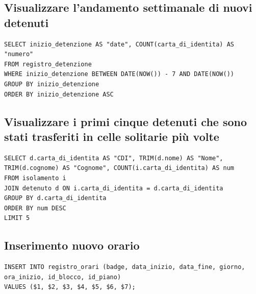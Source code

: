 \documentclass[a4paper,12pt]{report}
\begin{document}
\subsection{Visualizzare l'andamento settimanale di nuovi detenuti}
\begin{verbatim}
SELECT inizio_detenzione AS "date", COUNT(carta_di_identita) AS "numero"
FROM registro_detenzione
WHERE inizio_detenzione BETWEEN DATE(NOW()) - 7 AND DATE(NOW())
GROUP BY inizio_detenzione
ORDER BY inizio_detenzione ASC
\end{verbatim}
\subsection{Visualizzare i primi cinque detenuti che sono stati trasferiti in celle solitarie più volte}
\begin{verbatim}
SELECT d.carta_di_identita AS "CDI", TRIM(d.nome) AS "Nome", TRIM(d.cognome) AS "Cognome", COUNT(i.carta_di_identita) AS num
FROM isolamento i
JOIN detenuto d ON i.carta_di_identita = d.carta_di_identita
GROUP BY d.carta_di_identita
ORDER BY num DESC
LIMIT 5
\end{verbatim}
\subsection{Inserimento nuovo orario}
\begin{verbatim}
INSERT INTO registro_orari (badge, data_inizio, data_fine, giorno, ora_inizio, id_blocco, id_piano)
VALUES ($1, $2, $3, $4, $5, $6, $7);
\end{verbatim}
\end{document}
